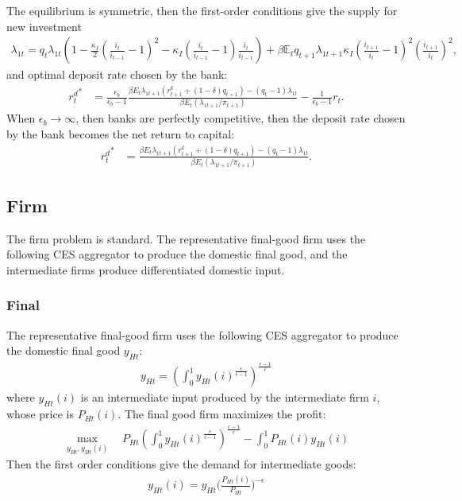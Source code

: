\documentclass[12pt]{article}
\newcommand{\E}{\mathbb{E}}
\begin{document}
The equilibrium is symmetric, then the first-order conditions give the supply for new investment 
\begin{align*}
\lambda_{1t} = q_t\lambda_{1t}(1-\frac{\kappa_I}{2}(\frac{i_t}{i_{t-1}}-1)^2-\kappa_I(\frac{i_t}{i_{t-1}}-1)\frac{i_t}{i_{t-1}})+ \beta\E_tq_{t+1}\lambda_{1t+1}\kappa_I(\frac{i_{t+1}}{i_t}-1)^2(\frac{i_{t+1}}{i_t})^2,
\end{align*}
and optimal deposit rate chosen by the bank:  
\begin{align*}
{r_{t}^d}^* &= \frac{\epsilon_b}{\epsilon_b-1}\frac{\beta E_t \lambda_{1t+1}(r_{t+1}^k+(1-\delta)q_{t+1})-(q_t-1)\lambda_{1t}}{\beta E_t (\lambda_{1t+1}/\pi_{t+1})}-\frac{1}{\epsilon_b-1}r_t.
\end{align*}
When $\epsilon_b \to \infty$, then banks are perfectly competitive, then the deposit rate chosen by the bank becomes the net return to capital: 
\begin{align*}
{r_{t}^d}^* &= \frac{\beta E_t \lambda_{1t+1}(r_{t+1}^k+(1-\delta)q_{t+1})-(q_t-1)\lambda_{1t}}{\beta E_t (\lambda_{1t+1}/\pi_{t+1})}.
\end{align*}

\subsection{Firm}
The firm problem is standard. The representative final-good firm uses the following CES aggregator to produce the domestic final good, and the intermediate firms produce differentiated domestic input. 

\subsubsection*{Final}
The representative final-good firm uses the following CES aggregator to produce the domestic final good $y_{Ht}$:
\begin{align*}
y_{Ht} = (\int_0^1 y_{Ht}(i)^{\frac{\epsilon}{\epsilon-1}})^{\frac{\epsilon-1}{\epsilon}}
\end{align*}
where $y_{Ht}(i)$ is an intermediate input produced by the intermediate firm $i$, whose price is $P_{Ht}(i)$. The final good firm maximizes the profit: 
\begin{align*}
\max_{y_{Ht},y_{Ht}(i)}\quad P_{Ht}(\int_0^1 y_{Ht}(i)^{\frac{\epsilon}{\epsilon-1}})^{\frac{\epsilon-1}{\epsilon}}- \int_0^1 P_{Ht}(i)y_{Ht}(i)
\end{align*}
Then the first order conditions give the demand for intermediate goods: 
\begin{align*}
y_{Ht}(i) = y_{Ht}\Big(\frac{P_{Ht}(i)}{P_{Ht}}\Big)^{-\epsilon}
\end{align*}
\end{document}
